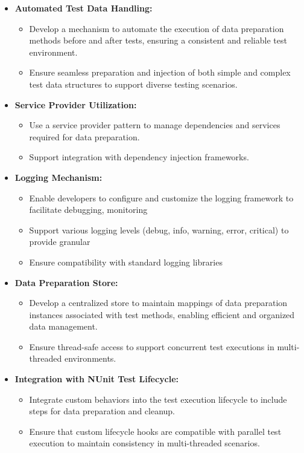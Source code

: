 \begin{itemize}
	\item \textbf{Automated Test Data Handling:}
	      \begin{itemize}
		      \item Develop a mechanism to automate the execution of data preparation methods before and after tests, ensuring a consistent and reliable test environment.
		      \item Ensure seamless preparation and injection of both simple and complex test data structures to support diverse testing scenarios.
	      \end{itemize} 
    \item \textbf{Service Provider Utilization:}
	      \begin{itemize}
		      \item Use a service provider pattern to manage dependencies and services required for data preparation.
		      \item Support integration with dependency injection frameworks.
	      \end{itemize}
    \item \textbf{Logging Mechanism:}
	      \begin{itemize}
		      \item Enable developers to configure and customize the logging framework to facilitate debugging, monitoring
              \item Support various logging levels (debug, info, warning, error, critical) to provide granular 
              \item Ensure compatibility with standard logging libraries
	      \end{itemize}
	\item \textbf{Data Preparation Store:}
	      \begin{itemize}
		      \item Develop a centralized store to maintain mappings of data preparation instances associated with test methods, enabling efficient and organized data management.
		      \item Ensure thread-safe access to support concurrent test executions in multi-threaded environments.
	      \end{itemize}

	\item \textbf{Integration with NUnit Test Lifecycle:}
	      \begin{itemize}
		      \item Integrate custom behaviors into the test execution lifecycle to include steps for data preparation and cleanup.
		      \item Ensure that custom lifecycle hooks are compatible with parallel test execution to maintain consistency in multi-threaded scenarios.
	      \end{itemize}


\end{itemize}
